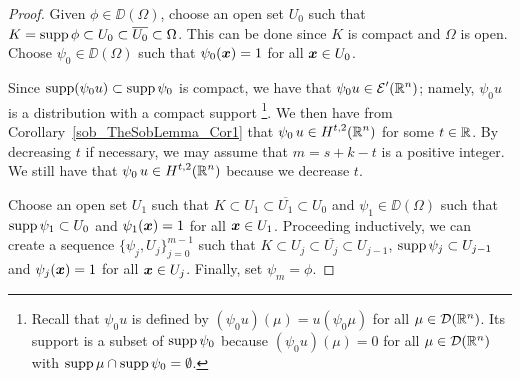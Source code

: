 \begin{proof}
Given $\phi \in \DD(\Omega)$, choose an open set $U_0$ such that
$K = \operatorname{supp} \phi \subset U_0 \subset \overline{U_0} \subset \Omega$.
This can be done since $K$ is compact and $\Omega$ is open.
Choose $\psi_0 \in \DD(\Omega)$ such that $\psi_0({\bm{x}}) = 1$
for all ${\bm{x}} \in U_0$.

Since $\operatorname{supp} (\psi_0 u) \subset \operatorname{supp} \psi_0$ is compact, we have that
$\displaystyle \psi_0 u \in \mathcal{E}'(\mathbb{R}^n)$; namely, $\psi_0 u $ is a distribution
with a compact support \footnote{Recall that $\psi_0 u$ is defined by
$(\psi_0 u)(\mu) = u (\psi_0\mu)$ for all $\mu \in \mathcal{D}(\mathbb{R}^n)$.  Its
support is a subset of $\operatorname{supp} \psi_0$ because
$(\psi_0 u)(\mu) = 0$ for all $\mu \in \mathcal{D}(\mathbb{R}^n)$ with
$\operatorname{supp} \mu \cap \operatorname{supp} \psi_0 = \emptyset$.}.  We then have from
Corollary~\ref{sob_TheSobLemma_Cor1} that
$\displaystyle \psi_0 \, u \in H^{t,2}(\mathbb{R}^n)$
for some $t \in \mathbb{R}$.  By decreasing $t$ if necessary, we may assume that
$m = s + k - t$ is a positive integer.  We still have that
$\displaystyle \psi_0 \, u \in H^{t,2}(\mathbb{R}^n)$ because we decrease $t$.

Choose an open set $U_1$ such that
$K \subset U_1 \subset \overline{U_1} \subset U_0$
and $\psi_1 \in \DD(\Omega)$ such that $\operatorname{supp} \psi_1 \subset U_0$ and
$\psi_1({\bm{x}}) = 1$ for all ${\bm{x}} \in U_1$.  Proceeding
inductively, we can create a sequence
$\displaystyle \{ \psi_j, U_j\}_{j=0}^{m-1}$ such that
$K \subset U_j \subset \overline{U_j} \subset U_{j-1}$,
$\operatorname{supp} \psi_j \subset U_{j-1}$ and $\psi_j({\bm{x}}) = 1$ for all
${\bm{x}} \in U_j$.  Finally, set $\psi_m = \phi$.


\end{proof}
